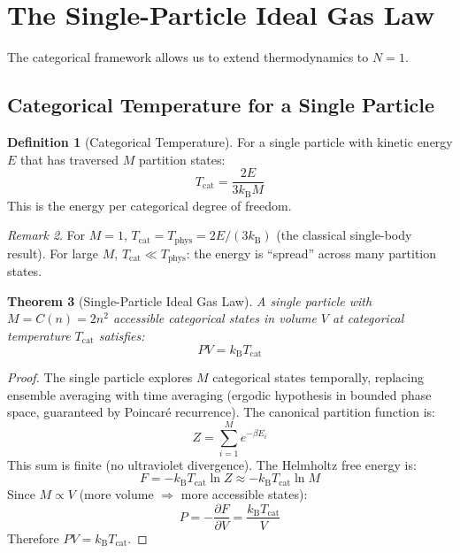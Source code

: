 \documentclass[twocolumn,10pt,a4paper]{article}
\theoremstyle{plain}
\newtheorem{theorem}{Theorem}[section]
\theoremstyle{definition}
\newtheorem{definition}[theorem]{Definition}
\theoremstyle{remark}
\newtheorem{remark}[theorem]{Remark}
\newcommand{\kB}{k_{\mathrm{B}}}
\begin{document}
\section{The Single-Particle Ideal Gas Law}
\label{sec:single_particle}

The categorical framework allows us to extend thermodynamics to $N = 1$.

\subsection{Categorical Temperature for a Single Particle}

\begin{definition}[Categorical Temperature]
\label{def:cat_temp}
For a single particle with kinetic energy $E$ that has traversed $M$ partition states:
\begin{equation}
    T_{\mathrm{cat}} = \frac{2E}{3\kB M}
\end{equation}
This is the energy per categorical degree of freedom.
\end{definition}

\begin{remark}
For $M = 1$, $T_{\mathrm{cat}} = T_{\mathrm{phys}} = 2E/(3\kB)$ (the classical single-body result). For large $M$, $T_{\mathrm{cat}} \ll T_{\mathrm{phys}}$: the energy is ``spread'' across many partition states.
\end{remark}

\begin{theorem}[Single-Particle Ideal Gas Law]
\label{thm:single_gas}
A single particle with $M = C(n) = 2n^2$ accessible categorical states in volume $V$ at categorical temperature $T_{\mathrm{cat}}$ satisfies:
\begin{equation}
\boxed{PV = \kB T_{\mathrm{cat}}}
\end{equation}
\end{theorem}

\begin{proof}
The single particle explores $M$ categorical states temporally, replacing ensemble averaging with time averaging (ergodic hypothesis in bounded phase space, guaranteed by Poincar\'{e} recurrence). The canonical partition function is:
\begin{equation}
    Z = \sum_{i=1}^{M} e^{-\beta E_i}
\end{equation}
This sum is finite (no ultraviolet divergence). The Helmholtz free energy is:
\begin{equation}
    F = -\kB T_{\mathrm{cat}} \ln Z \approx -\kB T_{\mathrm{cat}} \ln M
\end{equation}
Since $M \propto V$ (more volume $\Rightarrow$ more accessible states):
\begin{equation}
    P = -\frac{\partial F}{\partial V} = \frac{\kB T_{\mathrm{cat}}}{V}
\end{equation}
Therefore $PV = \kB T_{\mathrm{cat}}$.
\end{proof}
\end{document}
